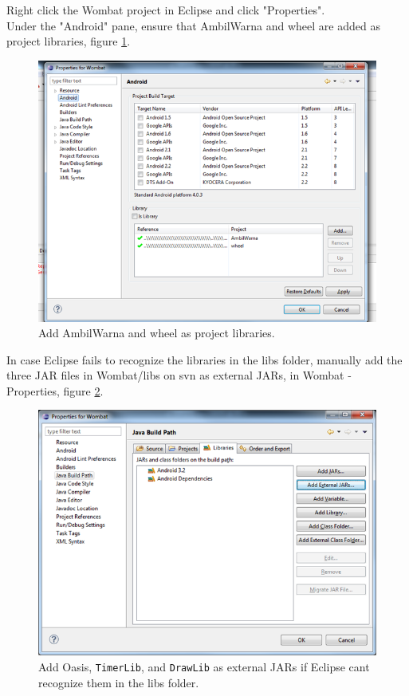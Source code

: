 Right click the Wombat project in Eclipse and click "Properties".\\
Under the "Android" pane, ensure that AmbilWarna and wheel are added as project libraries, figure \ref{fig:add_libs}.

\begin{figure}[H]
	\centering
		\includegraphics[scale=0.5]{Images/how_to_wombat/add_libs.png}
	\caption{Add AmbilWarna and wheel as project libraries.}
	\label{fig:add_libs}
\end{figure}

In case Eclipse fails to recognize the libraries in the libs folder, manually add the three JAR files in Wombat/libs on svn as external JARs, in Wombat - Properties, figure \ref{fig:external_jar}.

\begin{figure}[H]
	\centering
		\includegraphics[scale=0.5]{Images/how_to_wombat/external_jar.png}
	\caption{Add Oasis, \texttt{TimerLib}, and \texttt{DrawLib} as external JARs if Eclipse cant recognize them in the libs folder.}
	\label{fig:external_jar}
\end{figure}

